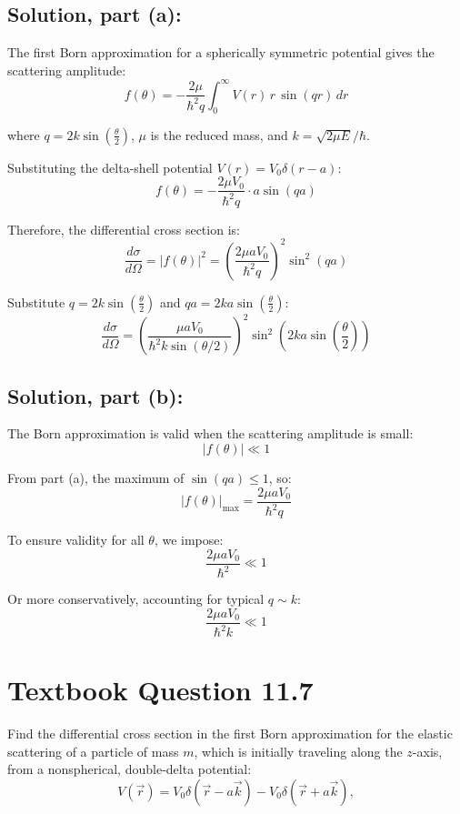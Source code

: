 \documentclass[12pt]{article}
\begin{document}
    \subsection{Solution, part (a):}
        The first Born approximation for a spherically symmetric potential gives the scattering amplitude:
        \[
            f(\theta) = -\frac{2\mu}{\hbar^2 q} \int_0^\infty V(r)\, r\, \sin(qr) \, dr
        \]
        
        where \( q = 2k \sin\left( \frac{\theta}{2} \right) \), \( \mu \) is the reduced mass, and \( k = \sqrt{2\mu E} / \hbar \).
    
        Substituting the delta-shell potential \( V(r) = V_0 \delta(r - a) \):
        \[
            f(\theta) = -\frac{2\mu V_0}{\hbar^2 q} \cdot a \sin(qa)
        \]
    
        Therefore, the differential cross section is:
        \[
            \frac{d\sigma}{d\Omega} = |f(\theta)|^2 = \left( \frac{2\mu a V_0}{\hbar^2 q} \right)^2 \sin^2(qa)
        \]
    
        Substitute \( q = 2k \sin\left( \frac{\theta}{2} \right) \) and \( qa = 2ka \sin\left( \frac{\theta}{2} \right) \):
        \[
            \boxed{
            \frac{d\sigma}{d\Omega} = \left( \frac{\mu a V_0}{\hbar^2 k \sin(\theta/2)} \right)^2 \sin^2\left( 2ka \sin\left( \frac{\theta}{2} \right) \right)}
        \]

    \subsection{Solution, part (b):}
        The Born approximation is valid when the scattering amplitude is small:
        \[
            |f(\theta)| \ll 1
        \]
    
        From part (a), the maximum of \( \sin(qa) \leq 1 \), so:
        \[
            |f(\theta)|_{\max} = \frac{2\mu a V_0}{\hbar^2 q}
        \]
    
        To ensure validity for all \( \theta \), we impose:
        \[
            \boxed{
            \frac{2\mu a V_0}{\hbar^2} \ll 1            }
        \]
    
        Or more conservatively, accounting for typical \( q \sim k \):
        \[
            \boxed{
            \frac{2\mu a V_0}{\hbar^2 k} \ll 1
        }
        \]


\section{Textbook Question 11.7}
    Find the differential cross section in the first Born approximation for the elastic scattering of a particle of mass \( m \), which is initially traveling along the \( z \)-axis, from a nonspherical, double-delta potential:
    \[
        V(\vec{r}) = V_0 \delta(\vec{r} - a \vec{k}) - V_0 \delta(\vec{r} + a \vec{k}),
    \]
    
\end{document}
